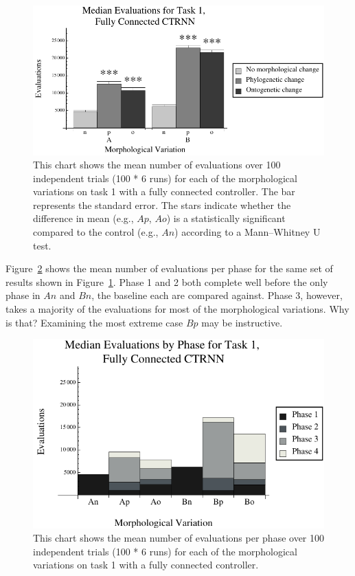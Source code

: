 \begin{figure}
  \centering
  \includegraphics[scale=1]{fig/evals-t1-l0.pdf} 
  \caption[Total evaluations for task 1, fully
    connected]{\label{fig:evals-t1-l0}This chart shows the mean number
    of evaluations over 100 independent trials (100 * 6 runs) for each
    of the morphological variations on task 1 with a fully connected
    controller.  The bar represents the standard error.  The stars
    indicate whether the difference in mean (e.g., $Ap$, $Ao$) is a
    statistically significant compared to the control (e.g., $An$)
    according to a Mann--Whitney U test.  }
\end{figure}

Figure~\ref{fig:step-evals-t1-l0} shows the mean number of evaluations
per phase for the same set of results shown in
Figure~\ref{fig:evals-t1-l0}.  Phase 1 and 2 both complete well before
the only phase in $An$ and $Bn$, the baseline each are compared
against.  Phase 3, however, takes a majority of the evaluations for
most of the morphological variations.  Why is that?  Examining the
most extreme case $Bp$ may be instructive.

\begin{figure}
  \centering
  \includegraphics[scale=1]{fig/step-evals-t1-l0.pdf} 
  \caption[Evaluations by phase for task 1, fully
    connected]{\label{fig:step-evals-t1-l0}This chart shows the mean
    number of evaluations per phase over 100 independent trials (100 *
    6 runs) for each of the morphological variations on task 1 with a
    fully connected controller.  }
\end{figure}



